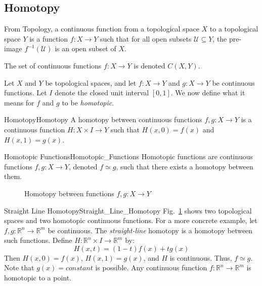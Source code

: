 \documentclass[crop=false,class=book,oneside]{standalone}                      %
\begin{document}
        \subsection{Homotopy}
            From Topology, a continuous function from a topological space $X$
            to a topological space $Y$ is a function $f:X\rightarrow{Y}$ such
            that for all open subsets $\mathcal{U}\subseteq{Y}$, the pre-image
            $f^{-1}(\mathcal{U})$ is an open subset of $X$.
            \begin{notation}
                The set of continuous functions $f:{X}\rightarrow{Y}$
                is denoted $C(X,Y)$.
            \end{notation}
            Let $X$ and $Y$ be topological spaces, and let
            $f:{X}\rightarrow{Y}$ and $g:{X}\rightarrow{Y}$ be continuous
            functions. Let $I$ denote the closed unit interval $[0,1]$. We now
            define what it means for $f$ and $g$ to be \textit{homotopic}.
            \begin{ldefinition}{Homotopy}{Homotopy}
                A homotopy between continuous functions
                $f,g:{X}\rightarrow{Y}$ is a continuous function
                $H:{X}\times{I}\rightarrow{Y}$ such that $H(x,0)=f(x)$ and
                $H(x,1)=g(x)$.
            \end{ldefinition}
            \begin{ldefinition}{Homotopic Functions}{Homotopic_Functions}
                Homotopic functions are continuous functions
                $f,g:{X}\rightarrow{Y}$, denoted ${f}\simeq{g}$,
                such that there exists a homotopy between them.
            \end{ldefinition}
            \begin{figure}[H]
                \centering
                \captionsetup{type=figure}
                
                \caption[Homotopy Diagram]
                        {Homotopy between functions $f,g:X\rightarrow Y$}
                \label{fig:homotopy_diagram_for_depicting_homotopy}
            \end{figure}
            \begin{lexample}{Straight Line Homotopy}{Straight_Line_Homotopy}
                Fig.~\ref{fig:homotopy_diagram_for_depicting_homotopy} shows
                two topological spaces and two homotopic continuous functions.
                For a more concrete example, let
                $f,g:\mathbb{R}^{n}\rightarrow\mathbb{R}^{m}$ be continuous.
                The \textit{straight-line} homotopy is a homotopy between such
                functions. Define
                $H:\mathbb{R}^{n}\times{I}\rightarrow\mathbb{R}^{m}$ by:
                \begin{equation}
                    \label{eqn:Straight_Line_Homotopy}
                    H(x,t)=(1-t)f(x)+tg(x)
                \end{equation}
                Then $H(x,0)=f(x)$, $H(x,1)=g(x)$, and $H$ is continuous. Thus,
                ${f}\simeq{g}$. Note that $g(x)=constant$ is possible. Any
                continuous function $f:\mathbb{R}^{n}\rightarrow\mathbb{R}^{m}$
                is homotopic to a point.
            \end{lexample}
\end{document}
